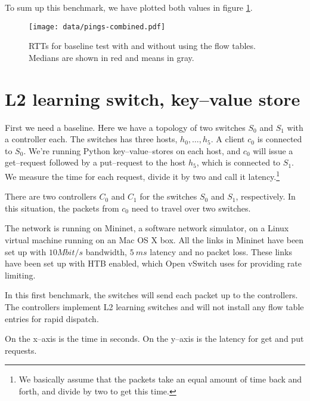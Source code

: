 
To sum up this benchmark, we have plotted both values in figure
\ref{figure:baseline.combined.plot}.

\begin{figure}
  \centering
  \texttt{[image: data/pings-combined.pdf]}
  \caption{RTTs for baseline test with and without using the flow tables.
  Medians are shown in red and means in gray.}
  \label{figure:baseline.combined.plot}
\end{figure}

\section{L2 learning switch, key--value store}
\label{chapter:benchmark.l2.kv.noflows}

First we need a baseline.  Here we have a topology of two switches $S_0$ and
$S_1$ with a controller each.  The switches has three hosts, $h_0, \dots, h_5$.
A client $c_0$ is connected to $S_0$. We're running Python
key--value--stores on each host, and $c_0$ will issue a get--request
followed by a put--request to the host $h_5$, which is connected to $S_1$.
We measure the time for each request, divide it
by two and call it latency.\footnote{We basically assume that the packets
take an equal amount of time back and forth, and divide by two to get this
time.}

There are two controllers $C_0$ and $C_1$ for the switches $S_0$ and $S_1$,
respectively.  In this situation, the packets from $c_0$ need to travel
over two switches.

The network is running on Mininet, a software network simulator, on a Linux
virtual machine running on an Mac OS X box.  All the links in Mininet have
been set up with $10 Mbit/s$ bandwidth, $5~ms$ latency and no packet
loss.  These links have been set up with \ac{HTB}
\cite{devera2002hierarchical} enabled, which Open vSwitch
 uses for providing rate limiting.

In this first benchmark, the switches will send each packet up to the
controllers.  The controllers implement L2 learning switches and will not
install any flow table entries for rapid dispatch.

On the x--axis is the time in seconds.  On the y--axis is the latency for
get and put requests.

